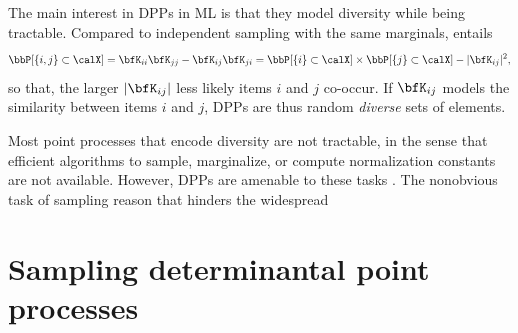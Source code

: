 \documentclass[twoside,11pt]{article}
\begin{document}
        The main interest in DPPs in ML is that they model diversity while being tractable.
        Compared to independent sampling with the same marginals,  entails
        \begin{equation*}
        \label{eq:2point_correlation_function_inclusion_proba_finite_case}
          \Proba{\{i,j\} \subset \calX}
            = {\bfK}_{ii}{\bfK}_{jj}-{\bfK}_{ij}{\bfK}_{ji}
            = \Proba{\{i\} \subset \calX}
              \times \Proba{\{j\} \subset \calX}
                - |{\bfK}_{ij}|^2,
        \end{equation*}
        so that, the larger $\lrabs{\bfK_{ij}}$ less likely items $i$ and $j$ co-occur.
        If $\bfK_{ij}$ models the similarity between items $i$ and $j$, DPPs are thus random \emph{diverse} sets of elements.

        Most point processes that encode diversity are not tractable, in the sense that efficient algorithms to sample, marginalize, or compute normalization constants are not available.
        However, DPPs are amenable to these tasks \citep{Gil14}.
        The nonobvious task of sampling reason that hinders the widespread



    \section{Sampling determinantal point processes} %
    \label{sec:sampling}
\end{document}
